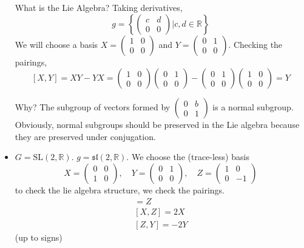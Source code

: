 \documentclass[12pt]{article}
\newcommand{\R}{\mathbb{R}}
\newcommand{\SL}{\text{SL}}
\renewcommand{\sl}{\mathfrak{sl}}
\begin{document}
\begin{itemize}
        What is the Lie Algebra? Taking derivatives, 
        \[g = \left\{\begin{pmatrix}
            c & d\\ 
            0 & 0
        \end{pmatrix} \bigg \vert c, d \in \R\right\}\] 
        We will choose a basis $X = \begin{pmatrix}
            1 & 0\\
            0 & 0
        \end{pmatrix}$ and $Y = \begin{pmatrix}
            0 & 1\\ 
            0 & 0
        \end{pmatrix}$. Checking the pairings, 
        \[[X, Y] = XY - YX = \begin{pmatrix}
            1 & 0\\
            0 & 0
        \end{pmatrix} \begin{pmatrix}
            0 & 1\\
            0 & 0
        \end{pmatrix} - \begin{pmatrix}
            0 & 1\\
            0 & 0
        \end{pmatrix} \begin{pmatrix}
            1 & 0\\
            0 & 0
        \end{pmatrix} = Y\] 

        Why? The subgroup of vectors formed by $\begin{pmatrix} 0 & b\\ 0 & 1\end{pmatrix}$ is a normal subgroup. Obviously, normal subgroups should be preserved in the Lie algebra because they are preserved under conjugation. 
        
        \item $G = \SL(2, \R)$. $g = \sl(2, \R)$. We choose the (trace-less) basis 
        \[X = \begin{pmatrix}
            0 & 0\\
            1 & 0
        \end{pmatrix}, \quad Y = \begin{pmatrix}
            0 & 1\\ 
            0 & 0
        \end{pmatrix}, \quad Z = \begin{pmatrix}
            1 & 0\\ 
            0 & -1
        \end{pmatrix}\] 
        to check the lie algebra structure, we check the pairings. 
        \begin{align*}
            [X, Y] = Z\\ 
            [X, Z] = 2X\\ 
            [Z, Y] = -2Y
        \end{align*}
        (up to signs)
    \end{itemize}
\end{document}

